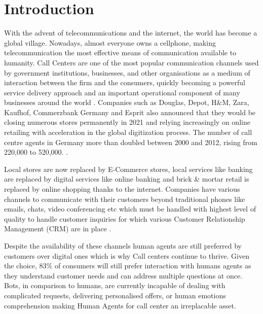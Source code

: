 \documentclass[3p,times]{elsarticle}
\begin{document}



\section{Introduction}
With the advent of telecommunications and the internet, the world has become a global village. Nowadays, almost everyone owns a cellphone, making telecommunication the most effective means of communication available to humanity. Call Centers are one of the most popular communication channels used by government institutions, businesses, and other organisations as a medium of interaction between the firm and the consumers, quickly becoming a powerful service delivery  approach and an important operational component of many businesses around the world \cite{chuchual_inbound_2010}. Companies such as Douglas, Depot, H\&M, Zara, Kaufhof, Commerzbank Germany \cite{commerzbank_commerzbank_2021} and Esprit also announced that they would be closing numerous stores permanently in 2021 and relying increasingly on online retailing with acceleration in the global digitization process. The number of call centre agents in Germany more than doubled between 2000 and 2012, rising from 220,000 to 520,000. \cite{herzog_callcenter_2017}. 


Local stores are now replaced by E-Commerce stores, local services like banking are replaced by digital services like online banking and brick \& mortar retail is replaced by online shopping thanks to the internet. Companies have various channels to communicate with their customers beyond traditional phones like emails, chats, video conferencing etc which must be handled with highest level of quality to handle customer inquiries for which various Customer Relationship Management (CRM) are in place \cite{glas_einzelhandel_2017}. 

Despite the availability of these channels human agents are still preferred by customers over digital ones which is why Call centers continue to thrive. Given the choice, 83\% of consumers will still prefer interaction with humans agents as they understand customer needs and can address multiple questions at once. Bots, in comparison to humans, are currently incapable of dealing with complicated requests, delivering personalised offers, or human emotions comprehension \cite{forrester_human_2017} making Human Agents for call center an irreplacable asset. 
\end{document}
